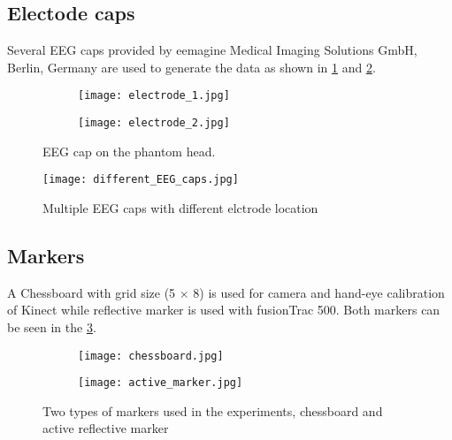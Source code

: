 \subsection{Electode caps}

Several EEG caps provided by eemagine Medical Imaging Solutions GmbH, Berlin, Germany are used to generate the data as shown in \cref{fig:Electrode_caps} and \cref{fig:multiple_eeg_caps}.

\begin{figure}[hbt!]
	\centering
	\begin{subfigure}{0.49\textwidth}
		\texttt{[image: electrode\_1.jpg]}	
	\end{subfigure}
	\hfill
	\begin{subfigure}{0.49\textwidth}
		\texttt{[image: electrode\_2.jpg]}	
	\end{subfigure}
	\caption{EEG cap on the phantom head.} 
	\label{fig:Electrode_caps}
\end{figure} 

\begin{figure}[hbt!]
	\centering
	\texttt{[image: different\_EEG\_caps.jpg]}
	\caption{Multiple EEG caps with different elctrode location}
	\label{fig:multiple_eeg_caps}	
\end{figure}

\subsection{Markers}
A Chessboard with grid size (5 $\times$ 8) is used for camera and hand-eye calibration of Kinect while reflective marker is used with fusionTrac 500. Both markers can be seen in the \cref{fig:markers}.  

\begin{figure}[hbt!]
	\centering
	\begin{subfigure}{0.49\textwidth}
		\texttt{[image: chessboard.jpg]}	
	\end{subfigure}
	\hfill
	\begin{subfigure}{0.49\textwidth}
		\texttt{[image: active\_marker.jpg]}	
	\end{subfigure}
	\caption{Two types of markers used in the experiments, chessboard and active reflective marker} 
	\label{fig:markers}
\end{figure} 